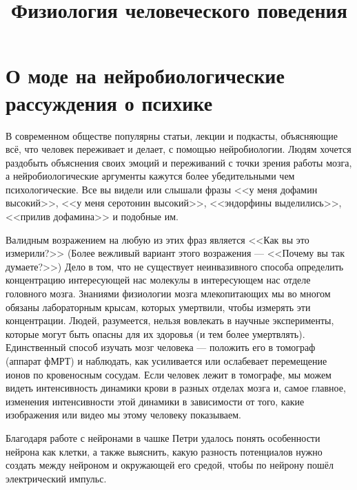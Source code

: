 \documentclass[11pt]{article}
\theoremstyle{remark}
\theoremstyle{definition}
\begin{document}
\baselineskip14pt
\bigskip





\title{Физиология человеческого поведения}


\maketitle


\bigskip
\bigskip








\section{О моде на нейробиологические рассуждения о психике}




В современном обществе популярны статьи, лекции и подкасты, объясняющие всё, что человек переживает и делает, с помощью нейробиологии. Людям хочется раздобыть объяснения своих эмоций и переживаний с точки зрения работы мозга, а нейробиологические аргументы кажутся более убедительными чем психологические. Все вы видели или слышали фразы <<у меня дофамин высокий>>, <<у меня серотонин высокий>>, <<эндорфины выделились>>, <<прилив дофамина>> и подобные им. 

Валидным возражением на любую из этих фраз является <<Как вы это измерили?>> (Более вежливый вариант этого возражения --- <<Почему вы так думаете?>>) Дело в том, что не существует неинвазивного способа определить концентрацию интересующей нас молекулы в интересующем нас отделе головного мозга. Знаниями физиологии мозга млекопитающих мы во многом обязаны лабораторным крысам, которых умертвили, чтобы измерять эти концентрации. Людей, разумеется, нельзя вовлекать в научные эксперименты, которые могут быть опасны для их здоровья (и тем более умертвлять). Единственный способ изучать мозг человека --- положить его в томограф (аппарат фМРТ) и наблюдать, как усиливается или ослабевает перемещение ионов по кровеносным сосудам. Если человек лежит в томографе, мы можем видеть интенсивность динамики крови в разных отделах мозга и, самое главное, изменения интенсивности этой динамики в зависимости от того, какие изображения или видео мы этому человеку показываем.

Благодаря работе с нейронами в чашке Петри удалось понять особенности нейрона как клетки, а также выяснить, какую разность потенциалов нужно создать между нейроном и окружающей его средой, чтобы по нейрону пошёл электрический импульс. 
\end{document}
